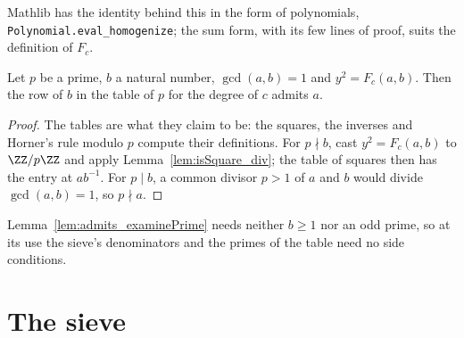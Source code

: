 Mathlib has the identity behind this in the form of polynomials, \verb|Polynomial.eval_homogenize|;
the sum form, with its few lines of proof, suits the definition of $F_c$.

\begin{lemma}\label{lem:admits_examinePrime}
  \leanok
  Let $p$ be a prime, $b$ a natural number, $\gcd(a, b) = 1$ and $y^2 = F_c(a, b)$. Then the row
  of $b$ in the table of $p$ for the degree of $c$ admits $a$.
\end{lemma}

\begin{proof}
  \leanok
  The tables are what they claim to be: the squares, the inverses and Horner's rule modulo $p$
  compute their definitions. For $p \nmid b$, cast $y^2 = F_c(a, b)$ to $\ZZ/p\ZZ$ and apply
  Lemma~\ref{lem:isSquare_div}; the table of squares then has the entry at $a b^{-1}$. For
  $p \mid b$, a common divisor $p > 1$ of $a$ and $b$ would divide $\gcd(a, b) = 1$, so
  $p \nmid a$.
\end{proof}

Lemma~\ref{lem:admits_examinePrime} needs neither $b \ge 1$ nor an odd prime, so at its use the
sieve's denominators and the primes of the table need no side conditions.

\section{The sieve}\label{sec:sieve}

